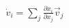 \documentclass[preview]{standalone}
\begin{document}
\begin{align*}
\dot{v}_i=\sum_j\frac{\partial\dot x_i}{\partial x_j}\vec{v}_j
\end{align*}
\end{document}
